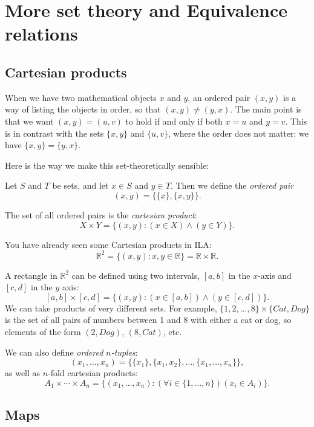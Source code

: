 \documentclass[11pt,dvipsnames]{book}
\def\R{\mathbb{R}}
\numberwithin{figure}{section} %
\numberwithin{table}{section} %
\begin{document}


\chapter{More set theory and Equivalence relations}%
\label{moresets}

\section{Cartesian products}%
\label{cartesianproducts}

When we have two mathematical objects $x$ and $y$, an ordered pair $(x,y)$ is a way of listing the objects in order, so that $(x,y) \neq (y,x)$.
The main point is that we want $(x,y) = (u,v)$ to hold if and only if both $x =u$ and $y = v$.
This is in contrast with the sets $\{x,y\}$ and $\{u,v\}$, where the order does not matter: we have $\{x,y\} = \{y,x\}$.

Here is the way we make this set-theoretically sensible:
\begin{definition}
Let $S$ and $T$ be sets, and let $x \in S$ and $y \in T$.
Then we define the \emph{ordered pair}
\[
(x,y) = \{\{x\},\{x,y\}\}.
\]

The set of all ordered pairs is the \emph{cartesian product}:
\[
X \times Y = \{(x,y) : (x \in X)\wedge (y \in Y)\}.
\]
\end{definition}

You have already seen some Cartesian products in ILA:
\[
\R^{2} = \{(x,y) : x,y\in\mathbb{R}\} = \mathbb{R}\times \mathbb{R}.
\]

A rectangle in $\mathbb{R}^{2}$ can be defined using two intervals, $[a,b]$ in the $x$-axis and $[c,d]$ in the $y$ axis:
\[
[a,b]\times [c,d]=\{(x,y) : (x\in [a,b]) \wedge (y\in [c,d])\}.
\]
We can take products of very different sets. For example, $\{1,2,...,8\}\times \{Cat,Dog\}$ is the set of all pairs of numbers between 1 and 8 with either a cat or dog, so elements of the form $(2,Dog)$, $(8,Cat)$, etc.

We can also define \emph{ordered $n$-tuples}:
\[
(x_1, \dots, x_n) = \{\{x_1\}, \{x_1,x_2\}, \dots, \{x_1, \dots, x_n\}\},
\]
as well as $n$-fold cartesian products:
\[
A_1 \times \cdots \times A_n =\{(x_1, \dots, x_n) : (\forall i \in \{1,\dots,n\})(x_i \in A_i)\}.
\]

\section{Maps}%
\label{maps}
\end{document}
